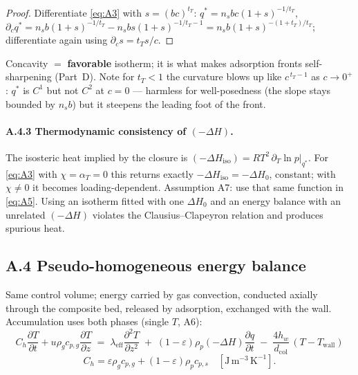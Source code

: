 \documentclass[11pt]{article}
\theoremstyle{remark}
\newcommand{\dcol}{d_{\mathrm{col}}}
\newcommand{\Twall}{T_{\mathrm{wall}}}
\newcommand{\lameff}{\lambda_{\mathrm{eff}}}
\begin{document}
\begin{proof}
Differentiate \eqref{eq:A3} with $s=(bc)^{t_T}$: $q^*=n_sbc(1+s)^{-1/t_T}$,
$\partial_c q^* = n_s b(1+s)^{-1/t_T}-n_s b s(1+s)^{-1/t_T-1}
= n_s b (1+s)^{-(1+t_T)/t_T}$; differentiate again using
$\partial_c s = t_T s/c$.
\end{proof}

Concavity $=$ \textbf{favorable} isotherm; it is what makes adsorption fronts
self-sharpening (Part~D). Note for $t_T<1$ the curvature blows up like
$c^{\,t_T-1}$ as $c\to0^+$: $q^*$ is $C^1$ but not $C^2$ at $c=0$ --- harmless
for well-posedness (the slope stays bounded by $n_sb$) but it steepens the
leading foot of the front.

\paragraph{A.4.3 Thermodynamic consistency of $(-\Delta H)$.}
The isosteric heat implied by the closure is
$(-\Delta H_{\mathrm{iso}}) = R T^2\,\partial_T \ln p \big|_{q^*}$. For
\eqref{eq:A3} with $\chi=\alpha_T=0$ this returns exactly
$-\Delta H_{\mathrm{iso}}=-\Delta H_0$, constant; with $\chi\neq0$ it becomes
loading-dependent. Assumption A7: use that same function in \eqref{eq:A5}.
Using an isotherm fitted with one $\Delta H_0$ and an energy balance with an
unrelated $(-\Delta H)$ violates the Clausius--Clapeyron relation and produces
spurious heat.

\subsection*{A.4 Pseudo-homogeneous energy balance}

Same control volume; energy carried by gas convection, conducted axially through
the composite bed, released by adsorption, exchanged with the wall. Accumulation
uses both phases (single $T$, A6):
\begin{equation}
\boxed{\;C_h\frac{\partial T}{\partial t}
+ u\rho_g c_{p,g}\frac{\partial T}{\partial z}
\;=\; \lameff\frac{\partial^2 T}{\partial z^2}
\;+\;(1-\varepsilon)\rho_p(-\Delta H)\frac{\partial q}{\partial t}
\;-\;\frac{4h_w}{\dcol}\,(T-\Twall)\;}
\tag{A.5}\label{eq:A5}
\end{equation}
\begin{equation*}
C_h=\varepsilon\rho_g c_{p,g}+(1-\varepsilon)\rho_p c_{p,s}
\quad[\mathrm{J\,m^{-3}\,K^{-1}}].
\end{equation*}
\end{document}
